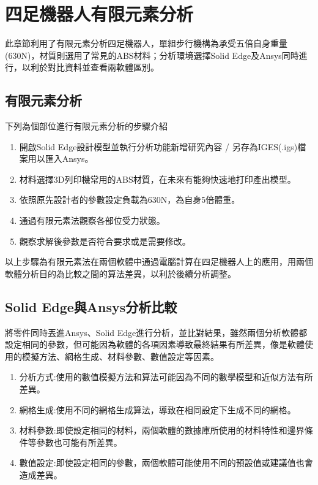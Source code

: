 \chapter{四足機器人有限元素分析}

此章節利用了有限元素分析四足機器人，單組步行機構為承受五倍自身重量(630N)，材質則選用了常見的ABS材料；分析環境選擇Solid Edge及Ansys同時進行，以利於對比資料並查看兩軟體區別。\\

\section{有限元素分析}
下列為個部位進行有限元素分析的步驟介紹
\begin{enumerate}
\item 開啟Solid Edge設計模型並執行分析功能新增研究內容 / 另存為IGES(.igs)檔案用以匯入Ansys。
\item 材料選擇3D列印機常用的ABS材質，在未來有能夠快速地打印產出模型。
\item 依照原先設計者的參數設定負載為630N，為自身5倍體重。
\item 通過有限元素法觀察各部位受力狀態。
\item 觀察求解後參數是否符合要求或是需要修改。\

\end{enumerate}
以上步驟為有限元素法在兩個軟體中通過電腦計算在四足機器人上的應用，用兩個軟體分析目的為比較之間的算法差異，以利於後續分析調整。\\

\section{Solid Edge與Ansys分析比較}
將零件同時丟進Ansys、Solid Edge進行分析，並比對結果，雖然兩個分析軟體都設定相同的參數，但可能因為軟體的各項因素導致最終結果有所差異，像是軟體使用的模擬方法、網格生成、材料參數、數值設定等因素。\

\begin{enumerate}
\item 分析方式:使用的數值模擬方法和算法可能因為不同的數學模型和近似方法有所差異。
\item 網格生成:使用不同的網格生成算法，導致在相同設定下生成不同的網格。
\item 材料參數:即使設定相同的材料，兩個軟體的數據庫所使用的材料特性和邊界條件等參數也可能有所差異。
\item	數值設定:即使設定相同的參數，兩個軟體可能使用不同的預設值或建議值也會造成差異。\

\end{enumerate}

